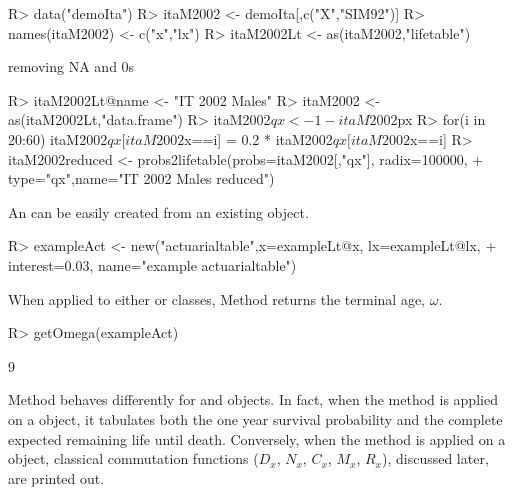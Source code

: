 \documentclass[nojss]{jss}
\begin{document}
\begin{Schunk}
\begin{Sinput}
R> data("demoIta")
R> itaM2002 <- demoIta[,c("X","SIM92")]
R> names(itaM2002) <- c("x","lx")
R> itaM2002Lt <- as(itaM2002,"lifetable")
\end{Sinput}
\begin{Soutput}
removing NA and 0s
\end{Soutput}
\begin{Sinput}
R> itaM2002Lt@name <- "IT 2002 Males"
R> itaM2002 <- as(itaM2002Lt,"data.frame")
R> itaM2002$qx <- 1-itaM2002$px
R> for(i in 20:60) itaM2002$qx[itaM2002$x==i] = 0.2 * itaM2002$qx[itaM2002$x==i]
R> itaM2002reduced <- probs2lifetable(probs=itaM2002[,"qx"], radix=100000,
+  		type="qx",name="IT 2002 Males reduced")
\end{Sinput}
\end{Schunk}


An  can be easily created from an existing  object.

\begin{Schunk}
\begin{Sinput}
R> exampleAct <- new("actuarialtable",x=exampleLt@x, lx=exampleLt@lx, 
+  interest=0.03, name="example actuarialtable")
\end{Sinput}
\end{Schunk}

When applied to
either  or  classes, Method   returns the terminal age, $\omega$.

\begin{Schunk}
\begin{Sinput}
R> getOmega(exampleAct)
\end{Sinput}
\begin{Soutput}
[1] 9
\end{Soutput}
\end{Schunk}

Method  behaves differently for  and 
 objects. In fact, when the  method is applied on a
 object, it tabulates both the one year survival probability and the complete
expected remaining life until death. Conversely, when the  method is
applied on a  object, classical commutation
functions ($D_x$, $N_x$, $C_x$, $M_x$, $R_x$), discussed later, are printed out.
\end{document}

